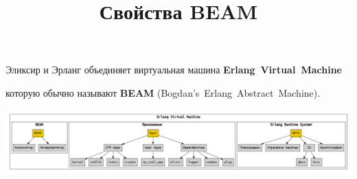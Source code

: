 \documentclass[10pt]{beamer}
\title{Свойства BEAM}
\begin{document}
\begin{frame}
  \centering
  Эликсир и Эрланг объединяет виртуальная машина
  \textbf{Erlang~Virtual~Machine}
  \par \bigskip
  которую обычно называют \textbf{BEAM}
  (Bogdan's~Erlang~Abstract~Machine).
\end{frame}

\begin{frame}
    \includegraphics[scale=0.2]{release}
\end{frame}
\end{document}
